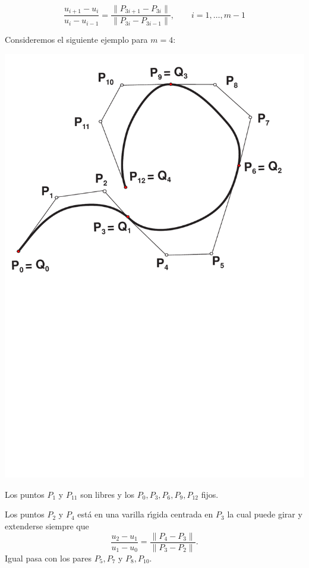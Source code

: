 \documentclass[ebook,oneside]{memoir}
\begin{document}
$$\frac{u_{i+1}-u_i}{u_i-u_{i-1}}= \frac{\parallel P_{3i+1}-P_{3i}\parallel}{\parallel P_{3i}-P_{3i-1} \parallel},\quad \quad i=1,\ldots,m-1$$

\vspace{0.2cm}

Consideremos el siguiente ejemplo para $m=4$:

\vspace{0.2cm}

\begin{minipage}{.4 \textwidth}
\includegraphics[scale=0.45]{3_28.pdf}
\end{minipage} \quad
\begin{minipage}{.55\textwidth}
Los puntos $P_1$ y $P_{11}$ son libres y los $P_0,P_3,P_6,P_9,P_{12}$ fijos.

Los puntos $P_2$ y $P_4$ est\'{a} en una varilla r\'{\i}gida centrada en $P_3$ la cual puede girar y extenderse siempre que
$$\frac{u_2-u_1}{u_1-u_0}= \frac{\parallel P_4-P_3\parallel}{\parallel P_3-P_2 \parallel}.$$
Igual pasa con los pares $P_5,P_7$ y $P_8,P_{10}$.
\end{minipage}
\end{document}
